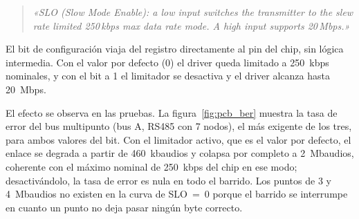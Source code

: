 \begin{quote}
\textit{«SLO (Slow Mode Enable): a low input switches the transmitter to the slew rate limited
250\,kbps max data rate mode. A high input supports 20\,Mbps.»}
\end{quote}

El bit de configuración viaja del registro directamente al pin del chip, sin lógica intermedia. Con
el valor por defecto (0) el driver queda limitado a 250~kbps nominales, y con el bit a 1 el limitador
se desactiva y el driver alcanza hasta 20~Mbps.

El efecto se observa en las pruebas. La figura~\ref{fig:pcb_ber} muestra la tasa de error del bus
multipunto (bus A, RS485 con 7 nodos), el más exigente de los tres, para ambos valores del bit. Con
el limitador activo, que es el valor por defecto, el enlace se degrada a partir de 460~kbaudios y colapsa
por completo a 2~Mbaudios, coherente con el máximo nominal de 250~kbps del chip en ese modo;
desactivándolo, la tasa de error es nula en todo el barrido. Los puntos de 3 y 4~Mbaudios no existen en
la curva de SLO~=~0 porque el barrido se interrumpe en cuanto un punto no deja pasar ningún byte
correcto.

